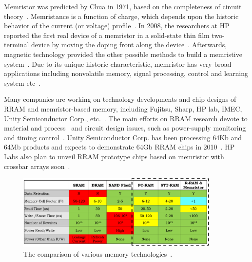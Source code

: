 Memristor was predicted by  Chua in 1971, based on the completeness of circuit theory~\cite{Chua71}. Memristance is a function of charge, which depends upon the historic behavior of the current (or voltage) profile~\cite{Chua76,Strukov08}. In 2008, the researchers at HP reported the first real device of a memristor in a solid-state thin film two-terminal device by moving the doping front along the device~\cite{Tour08}. Afterwards, magnetic technology provided the other possible methods to build a memristive system~\cite{Pershin08,Wang09}. Due to its unique historic characteristic, memristor has very broad applications including nonvolatile memory, signal processing, control and learning system etc~\cite{Chen09}.

Many companies are working on technology developments and chip designs of RRAM and memristor-based memory, including Fujitsu, Sharp, HP lab, IMEC, Unity Semiconductor Corp., etc.~\cite{Johnson10}. The main efforts on RRAM research devote to material and process~\cite{Fujimoto06,Jung07,Janousch07,Liu00,Hsu07} and circuit design issues, such as power-supply monitoring~\cite{Balasubramanian09} and timing control~\cite{Kwak09}. Unity Semiconductor Corp. has been processing 64Kb and 64Mb products and expects to demonstrate 64Gb RRAM chips in 2010~\cite{LaPedus09}. HP Labs also plan to unveil RRAM prototype chips based on memristor with crossbar arrays soon~\cite{Johnson08}.


\begin{figure}
\centering
\vspace{-10pt}
\includegraphics[width=0.9\textwidth]{./figure/2_table.pdf}
\vspace{-10pt}
\caption{The comparison of various memory technologies~\cite{ITRS07}.}
\label{table}
\vspace{-10pt}
\end{figure}

